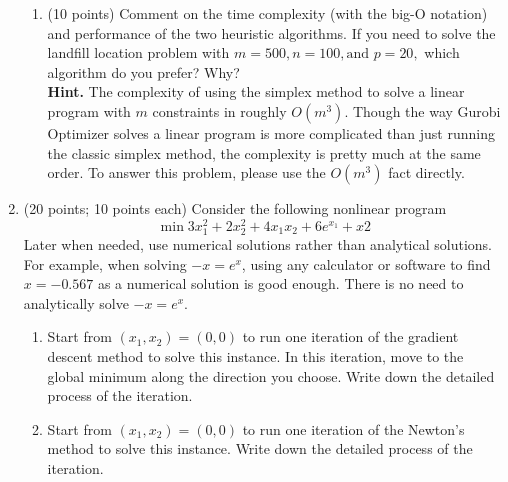 \documentclass[12pt]{article}
\begin{document}
\begin{enumerate}
\begin{enumerate}
                  \item (10 points) Comment on the time complexity (with the big-O notation) and performance of the two heuristic algorithms. If you need to solve the landfill location problem with $m = 500, n = 100, \text{and } p = 20,$ which algorithm do you prefer? Why?\\
                        \textbf{Hint.} The complexity of using the simplex method to solve a linear program with $m$ constraints in roughly $O(m^3).$ Though the way Gurobi Optimizer solves a linear program is more complicated than just running the classic simplex method, the complexity is pretty much at the same order. To answer this problem, please use the $O(m^3)$ fact directly.
            \end{enumerate}
      \item (20 points; 10 points each) Consider the following nonlinear program
            \begin{equation*}
                  \min 3x_1^2 + 2x_2^2 + 4x_1x_2 +6e^{x_1}+x2
            \end{equation*}
            Later when needed, use numerical solutions rather than analytical solutions. For example, when solving $-x = e^x$, using any calculator or software to find $x = -0.567$ as a numerical solution is good enough. There is no need to analytically solve $-x = e^x$.
            \begin{enumerate}
                  \item Start from $(x_1,x_2) = (0,0)$ to run one iteration of the gradient descent method to solve this instance. In this iteration, move to the global minimum along the direction you choose. Write down the detailed process of the iteration.
                  \item Start from $(x_1, x_2) = (0, 0)$ to run one iteration of the Newton’s method to solve this instance. Write down the detailed process of the iteration.
            \end{enumerate}
\end{enumerate}
\end{document}
